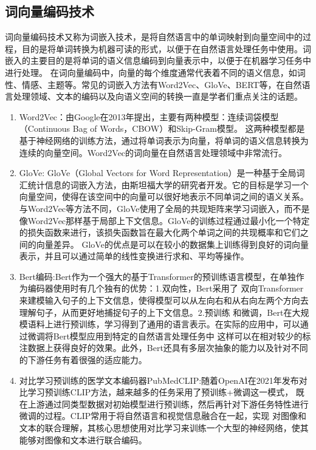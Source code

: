 \subsection{词向量编码技术}
词向量编码技术又称为词嵌入技术，是将自然语言中的单词映射到向量空间中的过程，目的是将单词转换为机器可读的形式，以便于在自然语言处理任务中使用。词嵌入的主要目的是将单词的语义信息编码到向量表示中，以便于在机器学习任务中进行处理。
在词向量编码中，向量的每个维度通常代表着不同的语义信息，如词性、情感、主题等。常见的词嵌入方法有Word2Vec、GloVe、BERT等，在自然语言处理领域、文本的编码以及向语义空间的转换一直是学者们重点关注的话题。
\begin{enumerate}[topsep = 0 pt, itemsep= 0 pt, parsep=0pt, partopsep=0pt, leftmargin=44pt, itemindent=0pt, labelsep=6pt, label=(\arabic*)]
	\item Word2Vec：由Google在2013年提出\cite{mikolov2013efficient,mikolov2013distributed}，主要有两种模型：连续词袋模型（Continuous Bag of Words，CBOW）和Skip-Gram模型。
	这两种模型都是基于神经网络的训练方法，通过将单词表示为向量，将单词的语义信息转换为连续的向量空间。Word2Vec的词向量在自然语言处理领域中非常流行。
	\item GloVe: GloVe（Global Vectors for Word Representation）是一种基于全局词汇统计信息的词嵌入方法\cite{pennington2014glove}，由斯坦福大学的研究者开发。它的目标是学习一个向量空间，使得在该空间中的向量可以很好地表示不同单词之间的语义关系。
	与Word2Vec等方法不同，GloVe使用了全局的共现矩阵来学习词嵌入，而不是像Word2Vec那样基于局部上下文信息。GloVe的训练过程通过最小化一个特定的损失函数来进行，该损失函数旨在最大化两个单词之间的共现概率和它们之间的向量差异。
	GloVe的优点是可以在较小的数据集上训练得到良好的词向量表示，并且可以通过简单的线性变换进行求和、平均等操作。
	\item Bert编码:Bert作为一个强大的基于Transformer的预训练语言模型\cite{devlin2018bert}，在单独作为编码器使用时有几个独有的优势：1.双向性，Bert采用了
	双向Transformer来建模输入句子的上下文信息，使得模型可以从左向右和从右向左两个方向去理解句子，从而更好地捕捉句子的上下文信息。2.预训练
	和微调，Bert在大规模语料上进行预训练，学习得到了通用的语言表示。在实际的应用中，可以通过微调将Bert模型应用到特定的自然语言处理任务中
	这样可以在相对较少的标注数据上获得良好的效果。此外，Bert还具有多层次抽象的能力以及针对不同的下游任务有着很强的适应能力。
	\item 对比学习预训练的医学文本编码器PubMedCLIP:随着OpenAI在2021年发布对比学习预训练CLIP方法，越来越多的任务采用了预训练+微调这一模式，
	既在上游通过同类型数据对初始模型进行预训练，然后再针对下游任务特性进行微调的过程。CLIP常用于将自然语言和视觉信息融合在一起，实现
	对图像和文本的联合理解，其核心思想使用对比学习来训练一个大型的神经网络，使其能够对图像和文本进行联合编码。
\end{enumerate}

